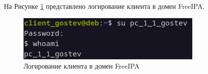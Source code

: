 \documentclass[14pt, a4paper]{extarticle}
\numberwithin{equation}{section}
\begin{document}
На Рисунке \ref{fig:ipa_client_logging} представлено логирование клиента в домен FreeIPA.
\begin{figure}[H]
        \centering
        \includegraphics[scale=1.5]{services/freeipa/client_logging.png}
        \caption{Логирование клиента в домен FreeIPA}
        \label{fig:ipa_client_logging}
\end{figure}





\begingroup
\let\itshape\upshape
\sloppy
\printbibliography[title=СПИСОК ИСПОЛЬЗУЕМЫХ ИСТОЧНИКОВ]
\endgroup
\end{document}
